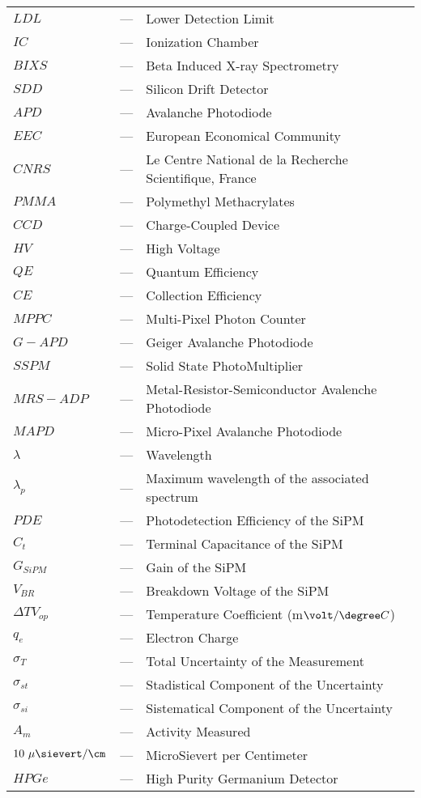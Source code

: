 \begin{longtable}{p{25mm} c p{120mm} }
$LDL$ & --- & Lower Detection Limit\\
$IC$ & --- & Ionization Chamber\\
$BIXS$ & --- & Beta Induced X-ray Spectrometry\\
$SDD$ & --- & Silicon Drift Detector\\
$APD$ & --- & Avalanche Photodiode\\
$EEC$ & --- & European Economical Community\\
$CNRS$ & --- & Le Centre National de la Recherche Scientifique, France\\
$PMMA$ & --- & Polymethyl Methacrylates\\
$CCD$ & --- & Charge-Coupled Device\\
$HV$ & --- & High Voltage\\
$QE$ & --- & Quantum Efficiency\\
$CE$ & --- & Collection Efficiency\\
$MPPC$ & --- & Multi-Pixel Photon Counter\\
$G-APD$ & --- & Geiger Avalanche Photodiode\\
$SSPM$ & --- & Solid State PhotoMultiplier\\
$MRS-ADP$ & --- & Metal-Resistor-Semiconductor Avalenche Photodiode\\
$MAPD$ & --- & Micro-Pixel Avalanche Photodiode\\
$\lambda$ & --- & Wavelength\\
$\lambda_p$ & --- & Maximum wavelength of the
\newline associated spectrum\\
$PDE$ & --- & Photodetection Efficiency of the SiPM\\
$C_t$ & --- & Terminal Capacitance of the SiPM\\
$G_{SiPM}$ & --- & Gain of the SiPM\\
$V_{BR}$ & --- & Breakdown Voltage of the SiPM\\
$\Delta TV_{op}$ & --- & Temperature Coefficient (m$\volt/\degree C$)\\
$q_{e}$ & --- & Electron Charge\\
$\sigma_{T}$ & --- & Total Uncertainty of the Measurement\\
$\sigma_{st}$ & --- & Stadistical Component of the Uncertainty\\
$\sigma_{si}$ & --- & Sistematical Component of the Uncertainty\\
$A_{m}$ & --- & Activity Measured\\
$10~\mu\sievert/\cm$ & --- & MicroSievert per Centimeter\\
$HPGe$ & --- & High Purity Germanium Detector\\


\end{longtable}
